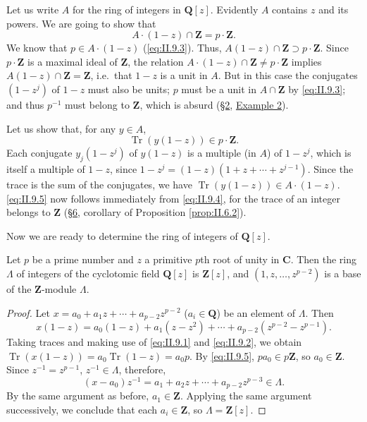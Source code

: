 Let us write $A$ for the ring of integers in $\mathbf{Q}[z]$. Evidently $A$
contains $z$ and its powers. We are going to show that
\begin{equation}
A\cdot(1-z)\cap\mathbf{Z}=p\cdot\mathbf{Z}.
\label{eq:II.9.4}
\end{equation}
We know that $p\in A\cdot(1-z)$ (\eqref{eq:II.9.3}). Thus,
$A(1-z)\cap\mathbf{Z}\supset p\cdot\mathbf{Z}$. Since $p\cdot\mathbf{Z}$ is a
maximal ideal of $\mathbf{Z}$, the relation
$A\cdot(1-z)\cap\mathbf{Z}\neq p\cdot\mathbf{Z}$ implies
$A(1-z)\cap\mathbf{Z}=\mathbf{Z}$, i.e.\ that $1-z$ is a unit in $A$. But in
this case the conjugates $(1-z^{j})$ of $1-z$ must also be units; $p$ must
be a unit in $A\cap\mathbf{Z}$ by \eqref{eq:II.9.3}; and thus $p^{-1}$ must
belong to $\mathbf{Z}$, which is absurd (\hyperref[sec:2.2]{§2}, \hyperref[exa:II.2.2]{Example 2}).

Let us show that, for any $y\in A$,
\begin{equation}
\operatorname{Tr}(y(1-z))\in p\cdot\mathbf{Z}.
\label{eq:II.9.5}
\end{equation}
Each conjugate $y_{j}(1-z^{j})$ of $y(1-z)$ is a multiple (in $A$) of
$1-z^{j}$, which is itself a multiple of $1-z$, since
$1-z^{j}=(1-z)(1+z+\cdots+z^{j-1})$. Since the trace is the sum of the
conjugates, we have $\operatorname{Tr}(y(1-z))\in A\cdot(1-z)$.
\eqref{eq:II.9.5} now follows immediately from \eqref{eq:II.9.4}, for the
trace of an integer belongs to $\mathbf{Z}$ (\hyperref[sec:2.6]{§6}, corollary of Proposition
\ref{prop:II.6.2}).

Now we are ready to determine the ring of integers of $\mathbf{Q}[z]$.

\begin{theorem}
\label{thm:II.9.2}
Let $p$ be a prime number and $z$ a primitive $p$th root of unity in
$\mathbf{C}$. Then the ring $\Lambda$ of integers of the cyclotomic field
$\mathbf{Q}[z]$ is $\mathbf{Z}[z]$, and $(1,z,\ldots,z^{p-2})$ is a base of
the $\mathbf{Z}$-module $\Lambda$.
\end{theorem}

\begin{proof}
Let $x=a_{0}+a_{1}z+\cdots+a_{p-2}z^{p-2}$ ($a_{i}\in\mathbf{Q}$) be an
element of $\Lambda$. Then
\[
x(1-z)=a_{0}(1-z)+a_{1}(z-z^{2})+\cdots+a_{p-2}(z^{p-2}-z^{p-1}).
\]
Taking traces and making use of \eqref{eq:II.9.1} and \eqref{eq:II.9.2}, we
obtain $\operatorname{Tr}(x(1-z))=a_{0}\operatorname{Tr}(1-z)=a_{0}p$. By
\eqref{eq:II.9.5}, $pa_{0}\in p\mathbf{Z}$, so $a_{0}\in\mathbf{Z}$. Since
$z^{-1}=z^{p-1}$, $z^{-1}\in\Lambda$, therefore,
\[
(x-a_{0})z^{-1}=a_{1}+a_{2}z+\cdots+a_{p-2}z^{p-3}\in\Lambda.
\]
By the same argument as before, $a_{1}\in\mathbf{Z}$. Applying the same
argument successively, we conclude that each $a_{i}\in\mathbf{Z}$, so
$\Lambda=\mathbf{Z}[z]$.
\end{proof}

